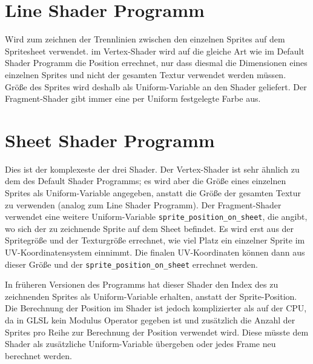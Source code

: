\section{Line Shader Programm}
Wird zum zeichnen der Trennlinien zwischen den einzelnen Sprites auf dem Spritesheet verwendet. im Vertex-Shader wird auf die gleiche Art wie im Default Shader Programm die Position errechnet, nur dass diesmal die Dimensionen eines einzelnen Sprites und nicht der gesamten Textur verwendet werden müssen. Größe des Sprites wird deshalb als Uniform-Variable an den Shader geliefert. Der Fragment-Shader gibt immer eine per Uniform festgelegte Farbe aus.

\section{Sheet Shader Programm}
Dies ist der komplexeste der drei Shader. Der Vertex-Shader ist sehr ähnlich zu dem des Default Shader Programms; es wird aber die Größe eines einzelnen Sprites als Uniform-Variable angegeben, anstatt die Größe der gesamten Textur zu verwenden (analog zum Line Shader Programm). Der Fragment-Shader verwendet eine weitere Uniform-Variable \lstinline{sprite_position_on_sheet}, die angibt, wo sich der zu zeichnende Sprite auf dem Sheet befindet. Es wird erst aus der Spritegröße und der Texturgröße errechnet, wie viel Platz ein einzelner Sprite im UV-Koordinatensystem einnimmt. Die finalen UV-Koordinaten können dann aus dieser Größe und der \lstinline{sprite_position_on_sheet} errechnet werden. 

In früheren Versionen des Programms hat dieser Shader den Index des zu zeichnenden Sprites als Uniform-Variable erhalten, anstatt der Sprite-Position. Die Berechnung der Position im Shader ist jedoch komplizierter als auf der CPU, da in GLSL kein Modulus Operator gegeben ist und zusätzlich die Anzahl der Sprites pro Reihe zur Berechnung der Position verwendet wird. Diese müsste dem Shader als zusätzliche Uniform-Variable übergeben oder jedes Frame neu berechnet werden.